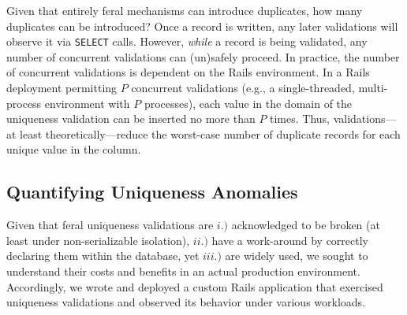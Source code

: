  Given that entirely feral
mechanisms can introduce duplicates, how many duplicates can be
introduced? Once a record is written, any later validations will
observe it via \texttt{SELECT} calls. However, \textit{while} a record
is being validated, any number of concurrent validations can
(un)safely proceed. In practice, the number of concurrent validations
is dependent on the Rails environment. In a Rails deployment
permitting $P$ concurrent validations (e.g., a single-threaded,
multi-process environment with $P$ processes), each value in the
domain of the uniqueness validation can be inserted no more than $P$
times. Thus, validations---at least theoretically---reduce the
worst-case number of duplicate records for each unique value in the
column.

\subsection{Quantifying Uniqueness Anomalies}

Given that feral uniqueness validations are $i.)$ acknowledged to be
broken (at least under non-serializable isolation), $ii.)$ have a
work-around by correctly declaring them within the database, yet
$iii.)$ are widely used, we sought to understand their costs and
benefits in an actual production environment. Accordingly, we wrote
and deployed a custom Rails application that exercised
uniqueness validations and observed its behavior under various
workloads.


